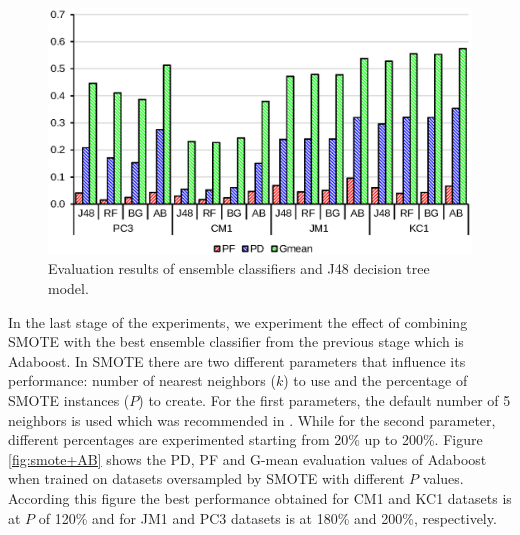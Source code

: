 \documentclass[runningheads,a4paper]{llncs}
\begin{document}
\begin{figure}[h]
\centering
\includegraphics[scale=0.6]{Ensembles.eps}
\caption{Evaluation results of ensemble classifiers and J48 decision tree model.}
\label{fig:ensembles}
\end{figure}


In the last stage of the experiments, we experiment the effect of combining SMOTE with the best ensemble classifier from the previous stage which is Adaboost. In SMOTE there are two different parameters that influence its performance: number of nearest neighbors ($k$) to use and the percentage of SMOTE instances ($P$) to create. For the first parameters, the default number of 5 neighbors is used which was recommended in \cite{chawla2002smote}. While for the second parameter, different percentages are experimented starting from 20\% up to 200\%. Figure \ref{fig:smote+AB} shows the PD, PF and G-mean evaluation values of Adaboost when trained on datasets oversampled by SMOTE with different $P$ values. According this figure the best performance obtained for CM1 and KC1 datasets is at $P$ of 120\% and for JM1 and PC3 datasets is at 180\% and 200\%, respectively.


 
\end{document}
